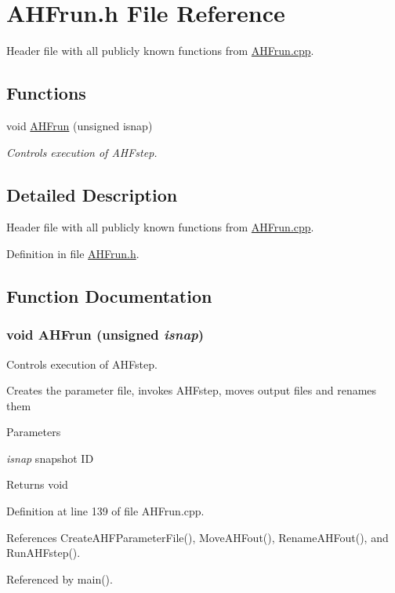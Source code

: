 \section{AHFrun.h File Reference}
\label{AHFrun_8h}


Header file with all publicly known functions from \hyperlink{AHFrun_8cpp}{AHFrun.cpp}.  


\subsection*{Functions}
\begin{DoxyCompactItemize}
\item 
void \hyperlink{AHFrun_8h_a4dfcaa53f6208d77814e562b7dab7d94}{AHFrun} (unsigned isnap)
\begin{DoxyCompactList}\small\item\em Controls execution of AHFstep. \item\end{DoxyCompactList}\end{DoxyCompactItemize}


\subsection{Detailed Description}
Header file with all publicly known functions from \hyperlink{AHFrun_8cpp}{AHFrun.cpp}. 

Definition in file \hyperlink{AHFrun_8h_source}{AHFrun.h}.



\subsection{Function Documentation}
\subsubsection[{AHFrun}]{\setlength{\rightskip}{0pt plus 5cm}void AHFrun (unsigned {\em isnap})}\label{AHFrun_8h_a4dfcaa53f6208d77814e562b7dab7d94}


Controls execution of AHFstep. 

Creates the parameter file, invokes AHFstep, moves output files and renames them 
\begin{DoxyParams}{Parameters}
\item[{\em isnap}]snapshot ID \end{DoxyParams}
\begin{DoxyReturn}{Returns}
void 
\end{DoxyReturn}


Definition at line 139 of file AHFrun.cpp.



References CreateAHFParameterFile(), MoveAHFout(), RenameAHFout(), and RunAHFstep().



Referenced by main().

